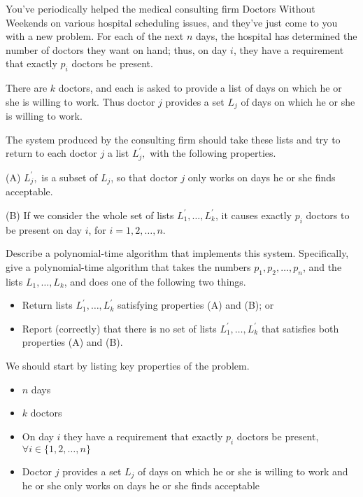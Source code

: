 \newpage
{} %

\problemdes

You’ve periodically helped the medical consulting firm Doctors Without Weekends on various hospital scheduling issues, and they’ve just come to you with a new problem. For each of the next $n$ days, the hospital has determined the number of doctors they want on hand; thus, on day $i$, they have a requirement that exactly $p_i$ doctors be present.

There are $k$ doctors, and each is asked to provide a list of days on which he or she is willing to work. Thus doctor $j$ provides a set $L_j$ of days on which he or she is willing to work.

The system produced by the consulting firm should take these lists and try to return to each doctor $j$ a list $L_j^{\prime},$ with the following properties.

(A) $L_j^{\prime},$ is a subset of $L_j$, so that doctor $j$ only works on days he or she finds acceptable.

(B) If we consider the whole set of lists $L_{1}^{\prime}, \ldots, L_{k}^{\prime}$, it causes exactly $p_i$ doctors to be present on day $i$, for $i = 1,2,\dots,n$.


Describe a polynomial-time algorithm that implements this system. Specifically, give a polynomial-time algorithm that takes the numbers $p_1,p_2, \dots, p_n$, and the lists $L_1,\dots,L_k$, and does one of the following two things.

\begin{itemize}
\item Return lists $L_{1}^{\prime}, \ldots, L_{k}^{\prime}$ satisfying properties (A) and (B); or
\item Report (correctly) that there is no set of lists $L_{1}^{\prime}, \ldots, L_{k}^{\prime}$ that satisfies both properties (A) and (B).
\end{itemize}



We should start by listing key properties of the problem.

\begin{itemize}
\item $n$ days
\item $k$ doctors 
\item On day $i$ they have a requirement that exactly $p_i$ doctors be present, $\forall i \in \{1, 2, \dots, n\}$
\item Doctor $j$ provides a set $L_j$ of days on which he or she is willing to work and he or she only works on days he or she finds acceptable
\end{itemize}

